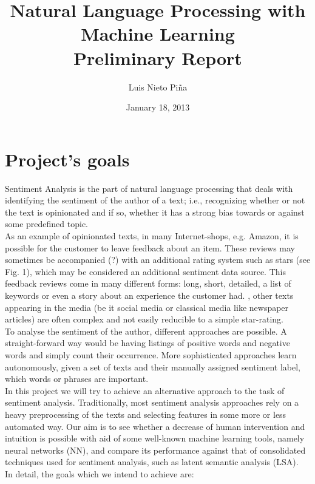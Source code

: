 \documentclass[10pt,a4paper]{report}
\title{Natural Language Processing with Machine Learning\\Preliminary Report}
\author{Luis Nieto Pi\~na}
\date{January 18, 2013}
\begin{document}

\tableofcontents

\chapter{Project's goals}
	
	Sentiment Analysis is the part of natural language processing that deals with identifying the sentiment of the author of a text; i.e., recognizing whether or not the text is opinionated and if so, whether it has a strong bias towards or against some predefined topic.\\
	
	As an example of opinionated texts, in many Internet-shops, e.g. Amazon, it is possible for the customer to leave feedback about an item. These reviews may sometimes be accompanied (?) with an additional rating system such as stars (see Fig. 1), which may be considered an additional sentiment data source. This feedback reviews come in many different forms: long, short, detailed, a list of keywords or even a story about an experience the customer had. , other texts appearing in the media (be it social media or classical media like newspaper articles) are often complex and not easily reducible to a simple star-rating.\\
	
	
	To analyse the sentiment of the author, different approaches are possible. A straight-forward way would be having  listings of positive words and negative words and simply count their occurrence. More sophisticated approaches learn autonomously, given a set of texts and their manually assigned sentiment label, which words or phrases are important.\\

	In this project we will try to achieve an alternative approach to the task of sentiment analysis. Traditionally, most sentiment analysis approaches rely on a heavy preprocessing of the texts and selecting features in some more or less automated way. Our aim is to see whether a decrease of human intervention and intuition is possible with aid of some well-known machine learning tools, namely neural networks (NN), and compare its performance against that of consolidated techniques used for sentiment analysis, such as latent semantic analysis (LSA).\\
	
	In detail, the goals which we intend to achieve are:
	
\end{document}
